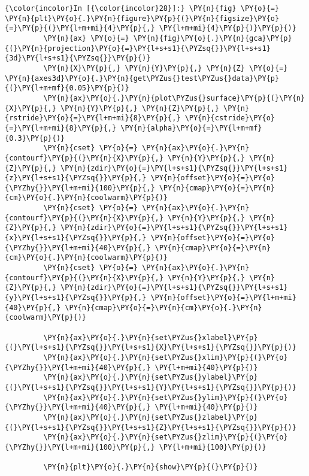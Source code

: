     \begin{Verbatim}[commandchars=\\\{\},frame=single,framerule=0.3mm,rulecolor=\color{cellframecolor}]
{\color{incolor}In [{\color{incolor}28}]:} \PY{n}{fig} \PY{o}{=} \PY{n}{plt}\PY{o}{.}\PY{n}{figure}\PY{p}{(}\PY{n}{figsize}\PY{o}{=}\PY{p}{(}\PY{l+m+mi}{4}\PY{p}{,} \PY{l+m+mi}{4}\PY{p}{)}\PY{p}{)}
         \PY{n}{ax} \PY{o}{=} \PY{n}{fig}\PY{o}{.}\PY{n}{gca}\PY{p}{(}\PY{n}{projection}\PY{o}{=}\PY{l+s+s1}{\PYZsq{}}\PY{l+s+s1}{3d}\PY{l+s+s1}{\PYZsq{}}\PY{p}{)}
         \PY{n}{X}\PY{p}{,} \PY{n}{Y}\PY{p}{,} \PY{n}{Z} \PY{o}{=} \PY{n}{axes3d}\PY{o}{.}\PY{n}{get\PYZus{}test\PYZus{}data}\PY{p}{(}\PY{l+m+mf}{0.05}\PY{p}{)}
         \PY{n}{ax}\PY{o}{.}\PY{n}{plot\PYZus{}surface}\PY{p}{(}\PY{n}{X}\PY{p}{,} \PY{n}{Y}\PY{p}{,} \PY{n}{Z}\PY{p}{,} \PY{n}{rstride}\PY{o}{=}\PY{l+m+mi}{8}\PY{p}{,} \PY{n}{cstride}\PY{o}{=}\PY{l+m+mi}{8}\PY{p}{,} \PY{n}{alpha}\PY{o}{=}\PY{l+m+mf}{0.3}\PY{p}{)}
         \PY{n}{cset} \PY{o}{=} \PY{n}{ax}\PY{o}{.}\PY{n}{contourf}\PY{p}{(}\PY{n}{X}\PY{p}{,} \PY{n}{Y}\PY{p}{,} \PY{n}{Z}\PY{p}{,} \PY{n}{zdir}\PY{o}{=}\PY{l+s+s1}{\PYZsq{}}\PY{l+s+s1}{z}\PY{l+s+s1}{\PYZsq{}}\PY{p}{,} \PY{n}{offset}\PY{o}{=}\PY{o}{\PYZhy{}}\PY{l+m+mi}{100}\PY{p}{,} \PY{n}{cmap}\PY{o}{=}\PY{n}{cm}\PY{o}{.}\PY{n}{coolwarm}\PY{p}{)}
         \PY{n}{cset} \PY{o}{=} \PY{n}{ax}\PY{o}{.}\PY{n}{contourf}\PY{p}{(}\PY{n}{X}\PY{p}{,} \PY{n}{Y}\PY{p}{,} \PY{n}{Z}\PY{p}{,} \PY{n}{zdir}\PY{o}{=}\PY{l+s+s1}{\PYZsq{}}\PY{l+s+s1}{x}\PY{l+s+s1}{\PYZsq{}}\PY{p}{,} \PY{n}{offset}\PY{o}{=}\PY{o}{\PYZhy{}}\PY{l+m+mi}{40}\PY{p}{,} \PY{n}{cmap}\PY{o}{=}\PY{n}{cm}\PY{o}{.}\PY{n}{coolwarm}\PY{p}{)}
         \PY{n}{cset} \PY{o}{=} \PY{n}{ax}\PY{o}{.}\PY{n}{contourf}\PY{p}{(}\PY{n}{X}\PY{p}{,} \PY{n}{Y}\PY{p}{,} \PY{n}{Z}\PY{p}{,} \PY{n}{zdir}\PY{o}{=}\PY{l+s+s1}{\PYZsq{}}\PY{l+s+s1}{y}\PY{l+s+s1}{\PYZsq{}}\PY{p}{,} \PY{n}{offset}\PY{o}{=}\PY{l+m+mi}{40}\PY{p}{,} \PY{n}{cmap}\PY{o}{=}\PY{n}{cm}\PY{o}{.}\PY{n}{coolwarm}\PY{p}{)}
         
         \PY{n}{ax}\PY{o}{.}\PY{n}{set\PYZus{}xlabel}\PY{p}{(}\PY{l+s+s1}{\PYZsq{}}\PY{l+s+s1}{X}\PY{l+s+s1}{\PYZsq{}}\PY{p}{)}
         \PY{n}{ax}\PY{o}{.}\PY{n}{set\PYZus{}xlim}\PY{p}{(}\PY{o}{\PYZhy{}}\PY{l+m+mi}{40}\PY{p}{,} \PY{l+m+mi}{40}\PY{p}{)}
         \PY{n}{ax}\PY{o}{.}\PY{n}{set\PYZus{}ylabel}\PY{p}{(}\PY{l+s+s1}{\PYZsq{}}\PY{l+s+s1}{Y}\PY{l+s+s1}{\PYZsq{}}\PY{p}{)}
         \PY{n}{ax}\PY{o}{.}\PY{n}{set\PYZus{}ylim}\PY{p}{(}\PY{o}{\PYZhy{}}\PY{l+m+mi}{40}\PY{p}{,} \PY{l+m+mi}{40}\PY{p}{)}
         \PY{n}{ax}\PY{o}{.}\PY{n}{set\PYZus{}zlabel}\PY{p}{(}\PY{l+s+s1}{\PYZsq{}}\PY{l+s+s1}{Z}\PY{l+s+s1}{\PYZsq{}}\PY{p}{)}
         \PY{n}{ax}\PY{o}{.}\PY{n}{set\PYZus{}zlim}\PY{p}{(}\PY{o}{\PYZhy{}}\PY{l+m+mi}{100}\PY{p}{,} \PY{l+m+mi}{100}\PY{p}{)}
         
         \PY{n}{plt}\PY{o}{.}\PY{n}{show}\PY{p}{(}\PY{p}{)}
\end{Verbatim}


